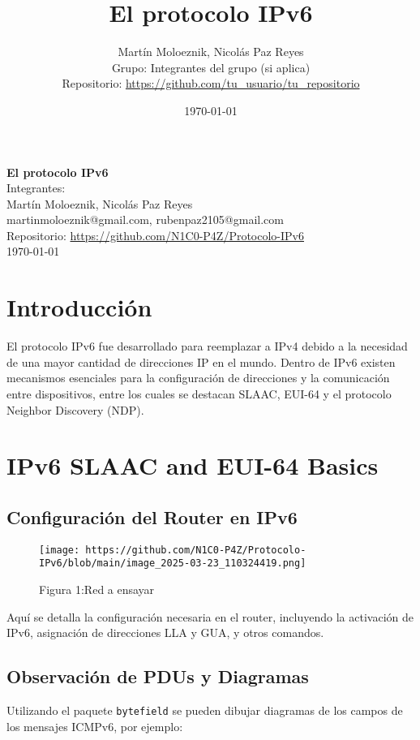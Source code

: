 \documentclass[a4paper,12pt]{article}
\title{El protocolo IPv6}
\author{Martín Moloeznik, Nicolás Paz Reyes\\[0.5em]
Grupo: Integrantes del grupo (si aplica)\\[0.5em]
Repositorio: \url{https://github.com/tu_usuario/tu_repositorio}}
\date{\today}
\begin{document}
\begin{titlepage}
  \centering
  \vspace*{2cm}
  {\large \textbf{El protocolo IPv6}}\\[1.5cm]
  
  {\large Integrantes:}\\
   \bigskip
  {\large Martín Moloeznik, Nicolás Paz Reyes} \\[0.5cm]
  {\large {martinmoloeznik@gmail.com}, {rubenpaz2105@gmail.com}} \\[0.5cm]
  \bigskip
  {\large Repositorio: \url{https://github.com/N1C0-P4Z/Protocolo-IPv6}}\\[1cm]
  
  \vfill
  {\large \today}
\end{titlepage}

\tableofcontents
\newpage

\section{Introducción}
El protocolo IPv6 fue desarrollado para reemplazar a IPv4 debido a la necesidad de una mayor cantidad de direcciones IP en el mundo. Dentro de IPv6 existen mecanismos esenciales para la configuración de direcciones y la comunicación entre dispositivos, entre los cuales se destacan SLAAC, EUI-64 y el protocolo Neighbor Discovery (NDP).

\section{IPv6 SLAAC and EUI-64 Basics}
\subsection{Configuración del Router en IPv6}
\begin{figure}[H]
  \centering
  \texttt{[image: https://github.com/N1C0-P4Z/Protocolo-IPv6/blob/main/image\_2025-03-23\_110324419.png]}
  \caption{Figura 1:Red a ensayar}
  \label{fig:github-imagen}
\end{figure}

Aquí se detalla la configuración necesaria en el router, incluyendo la activación de IPv6, asignación de direcciones LLA y GUA, y otros comandos.

\subsection{Observación de PDUs y Diagramas}
Utilizando el paquete \texttt{bytefield} se pueden dibujar diagramas de los campos de los mensajes ICMPv6, por ejemplo: \\
\end{document}

